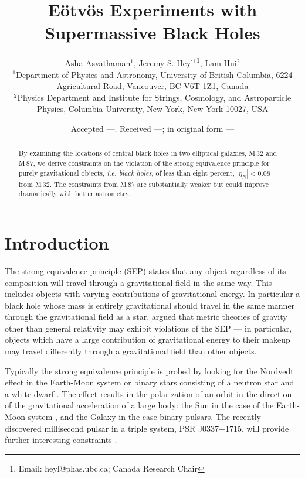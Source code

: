 \documentclass[useAMS,usenatbib]{mn2e}
\title[E\"otv\"os Experiments]{E\"otv\"os Experiments with 
  Supermassive Black Holes  }
\author[Asvathaman, Heyl \& Hui]{Asha Asvathaman$^{1}$, Jeremy S. Heyl$^{1}$\thanks{Email:
    heyl@phas.ubc.ca; Canada Research Chair}, Lam Hui$^{2}$ \\
$^{1}$Department of Physics and Astronomy, University of British
  Columbia, 6224 Agricultural Road, Vancouver, BC V6T 1Z1, Canada\\
  $^{2}$Physics Department and Institute for Strings, Cosmology, and Astroparticle Physics, Columbia University, New York, New York 10027, USA}
\begin{document}
\date{Accepted ---. Received ---; in original form ---}

\pagerange{\pageref{firstpage}--\pageref{lastpage}} 

\maketitle

\label{firstpage}

\begin{abstract}
  By examining the locations of central black holes in two elliptical
  galaxies, M\,32 and M\,87, we derive constraints on the violation of
  the strong equivalence principle for purely gravitational objects,
  {\em i.e. black holes}, of less than eight percent, $|\eta_N|<0.08$
  from M\,32.  The constraints from M\,87 are substantially weaker but could
  improve dramatically with better astrometry.
\end{abstract}

\section{Introduction}

The strong equivalence principle (SEP) states that any object
regardless of its composition will travel through a gravitational
field in the same way.  This includes objects with varying
contributions of gravitational energy.  In particular a black hole
whose mass is entirely gravitational should travel in the same manner
through the gravitational field as a
star. \citet{1968PhRv..169.1014N,1968PhRv..169.1017N} argued that
metric theories of gravity other than general relativity may exhibit
violations of the SEP --- in particular,
objects 
which
have a large contribution of gravitational energy to
their makeup may travel differently through a gravitational field than
other objects.

Typically the strong equivalence principle is probed by looking for
the Nordvedt effect in the Earth-Moon system or binary stars
consisting of a neutron star and a white dwarf \citep{Stairs:2005}.
The \citet{1968PhRv..170.1186N} effect results in the polarization of
an orbit in the direction of the gravitational acceleration of a large
body: the Sun in the case of the Earth-Moon system
\citep{1976PhRvL..36..551W,1976PhRvL..36..555S}, and the Galaxy in the
case binary pulsars.  The recently discovered millisecond pulsar in a
triple system, PSR J0337+1715, will provide further interesting
constraints \citep{Ransom:2014aa}.
\end{document}
